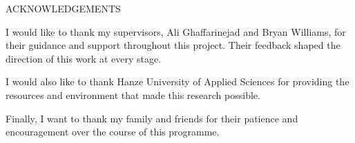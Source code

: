 \begin{center}
    ACKNOWLEDGEMENTS
    \vspace{5mm} %
\end{center} 

I would like to thank my supervisors, Ali Ghaffarinejad and Bryan Williams, for their guidance and support throughout this project. Their feedback shaped the direction of this work at every stage.

I would also like to thank Hanze University of Applied Sciences for providing the resources and environment that made this research possible.

Finally, I want to thank my family and friends for their patience and encouragement over the course of this programme.